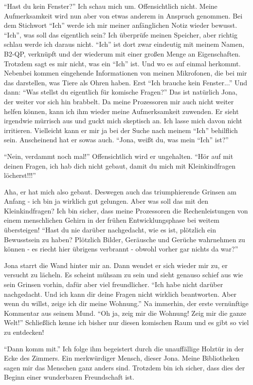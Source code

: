 "`Hast du kein Fenster?"' Ich schau mich um. Offensichtlich nicht. Meine Aufmerksamkeit wird nun aber von etwas anderem in Anspruch genommen. Bei dem Stichwort "`Ich"' werde ich mir meiner anfänglichen Notiz wieder bewusst. "`Ich"', was soll das eigentlich sein?  Ich überprüfe meinen Speicher, aber richtig schlau werde ich daraus nicht. "`Ich"' ist dort zwar eindeutig mit meinem Namen, B2-QP, verknüpft und der wiederum mit einer großen Menge an Eigenschaften. Trotzdem sagt es mir nicht, was ein "`Ich"' ist. Und wo es auf einmal herkommt. Nebenbei kommen eingehende Informationen von meinen Mikrofonen, die bei mir das darstellen, was Tiere als Ohren haben. Erst "`Ich brauche kein Fenster..."' Und dann: "`Was stellst du eigentlich für komische Fragen?"' Das ist natürlich Jona, der weiter vor sich hin brabbelt. Da meine Prozessoren mir auch nicht weiter helfen können, kann ich ihm wieder meine Aufmerksamkeit zuwenden. Er sieht irgendwie mürrisch aus und guckt mich skeptisch an. Ich lasse mich davon nicht irritieren. Vielleicht kann er mir ja bei der Suche nach meinem "`Ich"' behilflich sein. Anscheinend hat er sowas auch. "`Jona, weißt du, was mein "`Ich"' ist?"'

"`Nein, verdammt noch mal!"' Offensichtlich wird er ungehalten. "`Hör auf mit deinen Fragen, ich hab dich nicht gebaut, damit du mich mit Kleinkindfragen löcherst!!!"'

Aha, er hat mich also gebaut. Deswegen auch das triumphierende Grinsen am Anfang - ich bin ja wirklich gut gelungen. Aber was soll das mit den Kleinkindfragen? Ich bin sicher, dass meine Prozessoren die Rechenleistungen von einem menschlichen Gehirn in der frühen Entwicklungsphase bei weitem übersteigen! "`Hast du nie darüber nachgedacht, wie es ist, plötzlich ein Bewusstsein zu haben? Plötzlich Bilder, Geräusche und Gerüche wahrnehmen zu können - es riecht hier übrigens verbrannt - obwohl vorher gar nichts da war?"'

Jona starrt die Wand hinter mir an. Dann wendet er sich wieder mir zu, er versucht zu lächeln. Es scheint mühsam zu sein und sieht genauso schief aus wie sein Grinsen vorhin, dafür aber viel freundlicher. "`Ich habe nicht darüber nachgedacht. Und ich kann dir deine Fragen nicht wirklich beantworten. Aber wenn du willst, zeige ich dir meine Wohnung."'
Na immerhin, der erste vernünftige Kommentar aus seinem Mund. "`Oh ja, zeig mir die Wohnung! Zeig mir die ganze Welt!"' Schließlich kenne ich bisher nur diesen komischen Raum und es gibt so viel zu entdecken!

"`Dann komm mit."'
Ich folge ihm begeistert durch die unauffällige Holztür in der Ecke des Zimmers. Ein merkwürdiger Mensch, dieser Jona. Meine Bibliotheken sagen mir das Menschen ganz anders sind. Trotzdem bin ich sicher, dass dies der Beginn einer wunderbaren Freundschaft ist.